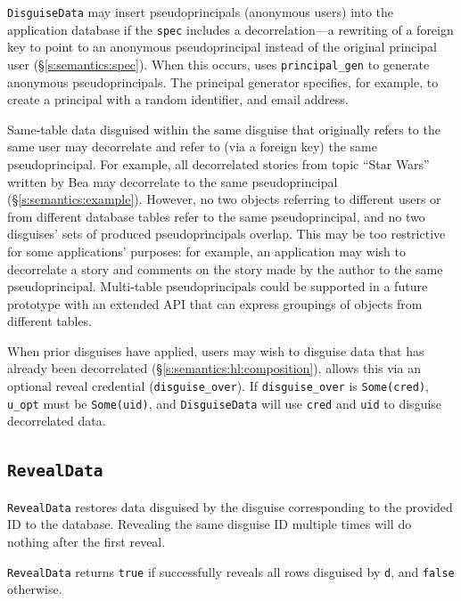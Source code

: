 %
\texttt{DisguiseData} may insert pseudoprincipals (anonymous users) into the
application database if the \texttt{spec} includes a decorrelation---a rewriting
of a foreign key to point to an anonymous pseudoprincipal instead of the
original principal user (\S\ref{s:semantics:spec}).  When this occurs, \sys
uses \texttt{principal\_gen} to generate anonymous pseudoprincipals. The
principal generator specifies, for example, to create a principal with a random
identifier, and email address.
%

%
Same-table data disguised within the same disguise that originally refers to the
same user may decorrelate and refer to (via a foreign key) the same
pseudoprincipal.
%
For example, all decorrelated stories from topic ``Star Wars'' written by Bea
may decorrelate to the same pseudoprincipal (\S\ref{s:semantics:example}).
%
However, no two objects referring to different users or from different database
tables refer to the same pseudoprincipal, and no two disguises' sets of produced
pseudoprincipals overlap.
%
This may be too restrictive for some applications' purposes: for example, an
application may wish to decorrelate a story and comments on the story made by
the author to the same pseudoprincipal.
%
Multi-table pseudoprincipals could be supported in a future \sys prototype with
an extended API that can express groupings of objects from different tables.

When prior disguises have applied, users may wish to disguise data that has
already been decorrelated (\S\ref{s:semantics:hl:composition}).  \sys allows
this via an optional reveal credential (\texttt{disguise\_over}). If
\texttt{disguise\_over} is \texttt{Some(cred)}, \texttt{u\_opt} must be
\texttt{Some(uid)}, and \texttt{DisguiseData} will use \texttt{cred} and
\texttt{uid} to disguise decorrelated data.

\subsection{\texttt{RevealData}}
\label{s:semantics:revealdata}

\texttt{RevealData} restores data disguised by the disguise corresponding to the provided ID to
the database. Revealing the same disguise ID multiple times will do nothing
after the first reveal. 

\texttt{RevealData} returns \texttt{true} if \sys successfully reveals all rows disguised by \texttt{d}, and \texttt{false} otherwise.

